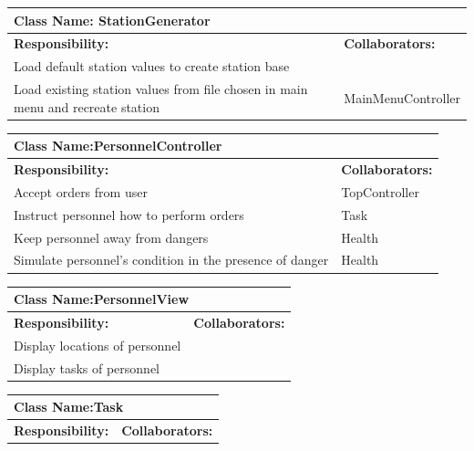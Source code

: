 \documentclass[]{article}
\begin{document}
\begin{enumerate}[a)]
\begin{table}[ht]
		\centering
		\begin{tabular}{|p{5cm}|p{5cm}|}
		\hline 
		 \multicolumn{2}{|l|}{\textbf{Class Name: StationGenerator}} \\
		\hline
		\textbf{Responsibility:} & \textbf{Collaborators:} \\
		\hline
		Load default station values to create station base & \\
		\hline
		Load existing station values from file chosen in main menu and recreate station & MainMenuController\\
		\hline
		\end{tabular}
	\end{table}
	\begin{table}[ht]
		\centering
		\begin{tabular}{|p{5cm}|p{5cm}|}
		\hline 
		 \multicolumn{2}{|l|}{\textbf{Class Name:}PersonnelController} \\
		\hline
		\textbf{Responsibility:} & \textbf{Collaborators:} \\
		\hline
		Accept orders from user & TopController \\
		\hline
		Instruct personnel how to perform orders & Task \\
		\hline
		Keep personnel away from dangers & Health \\
		\hline
		Simulate personnel's condition in the presence of danger & Health \\
		\hline
		\end{tabular}
	\end{table}
	\begin{table}[ht]
		\centering
		\begin{tabular}{|p{5cm}|p{5cm}|}
		\hline 
		 \multicolumn{2}{|l|}{\textbf{Class Name:}PersonnelView} \\
		\hline
		\textbf{Responsibility:} & \textbf{Collaborators:} \\
		\hline
		Display locations of personnel &  \\
		\hline
		Display tasks of personnel &  \\
		\hline
		\end{tabular}
	\end{table}
	\begin{table}[ht]
		\centering
		\begin{tabular}{|p{5cm}|p{5cm}|}
		\hline 
		 \multicolumn{2}{|l|}{\textbf{Class Name:}Task} \\
		\hline
		\textbf{Responsibility:} & \textbf{Collaborators:} \\
		\hline 

\end{tabular}
\end{table}
\end{enumerate}
\end{document}
